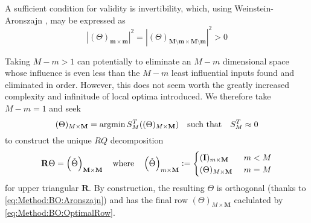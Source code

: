 \documentclass[preprint,12pt]{elsarticle}
\newcommand*{\M}[1]{\ensuremath{#1}\xspace}
\newcommand*{\vr}[1]{\M{\mathbf{#1}}}
\newcommand*{\deq}{\M{\mathrel{\mathop:}=}}
\newcommand{\T}[1]{\text{#1}}
\newcommand*{\QT}[2][]{\M{\quad\T{#2}\ifthenelse{\equal{#1}{}}{\quad}{#1}}}
\newcommand*{\modulus}[1]{\M{\left\lvert#1\right\rvert}}
\DeclareMathOperator*{\argmin}{argmin}
\begin{document}
            A sufficient condition for validity is invertibility, which, using Weinstein-Aronszajn \cite{Tao2013}, may be expressed as
            \begin{equation} \label{eq:Method:BO:Aronszajn}
                \modulus{(\Theta)_{\vr{m}\times\vr{m}}}^2 = \modulus{(\Theta)_{\vr{M}\setminus\vr{m}\times\vr{M}\setminus\vr{m}}}^2 > 0
            \end{equation}

            Taking $M-m>1$ can potentially to eliminate an $M-m$ dimensional space whose influence is even less than the $M-m$ least influential inputs found and eliminated in order. However, this does not seem worth the greatly increased complexity and infinitude of local optima introduced.
            We therefore take $M-m=1$ and seek
            \begin{equation} \label{eq:Method:BO:OptimalRow}
                (\Theta)_{M\times\vr{M}} = \argmin S^{T}_{M}((\Theta)_{M\times\vr{M}}) \QT{such that} S^{T}_{M} \approx 0
            \end{equation}
            to construct the unique $RQ$ decomposition
            \begin{equation} \label{eq:Method:BO:RQ}
                \vr{R}\Theta = 
                \left(\mathring{\Theta}\right)_{\vr{M}\times \vr{M}} \QT{where} \left(\mathring{\Theta}\right)_{m\times \vr{M}} \deq 
                \begin{cases}
                    (\vr{I})_{m\times\vr{M}} \ & m<M \\
                    (\Theta)_{M\times\vr{M}} \ & m=M \\
                \end{cases}
            \end{equation}
            for upper triangular $\vr{R}$. By construction, the resulting $\Theta$ is orthogonal (thanks to \cref{eq:Method:BO:Aronszajn}) and has the final row $(\Theta)_{M\times\vr{M}}$ caclulated by \cref{eq:Method:BO:OptimalRow}.
\end{document}
